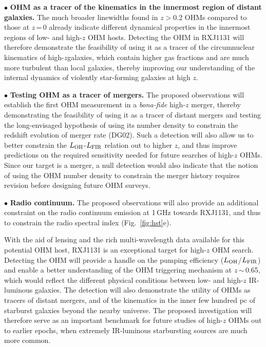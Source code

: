 \documentclass[letterpaper,11pt]{article}
\newcommand{\LFIR}{\mbox{$L_{\rm FIR}$}\xspace}
\newcommand{\LOH}{$L_{\rm OH}$\xspace}
\newcommand{\Fig}[1]{Fig.~\ref{fig:#1}}
\newcommand{\eq}{\,=\,}
\newcommand{\ssim}{\,$\sim$\,}
\newcommand{\highz}{high-$z$\space}
\newcommand{\obs}{observations\xspace}
\begin{document}
\noindent $\bullet$ {\bf OHM as a tracer of the kinematics in the innermost region of distant galaxies.}
The much broader linewidths found in $z$$>$0.2 OHMs \citep[typically at least a factor of $>$2 in FWHM;][DG02]{Baan92a}
compared to those at $z$\eq0 already indicate
different dynamical properties in the innermost regions of low- and high-$z$ OHM hosts.
Detecting the OHM in RXJ1131 will therefore demonstrate the feasibility of
using it as a tracer of the circumnuclear kinematics of \highz galaxies, which contain higher 
gas fractions and are much more turbulent than local galaxies, thereby improving
our understanding of the internal dynamics of violently star-forming galaxies at high $z$.

\noindent $\bullet$ {\bf Testing OHM as a tracer of mergers.}
The proposed \obs will establish the first OHM measurement in a {\it bona-fide} high-$z$ merger, thereby
demonstrating the feasibility of using it as a tracer of distant mergers and
testing the long-envisaged hypothesis of using its number density to constrain
the redshift evolution of merger rate (DG02).
Such a detection will also allow us to better constrain the
\LOH-\LFIR relation out to higher $z$, %
and thus improve predictions on the required sensitivity needed for future searches of high-$z$ OHMs.
Since our target is a merger,
a null detection would also indicate that the notion of
using the OHM number density to constrain the merger history requires revision before designing future OHM surveys.

\noindent $\bullet$ {\bf Radio continuum.}
The proposed \obs will also provide an additional constraint on the radio continuum emission at 1\,GHz 
towards RXJ1131, and thus to constrain the radio spectral index (\Fig{hst}e).

\noindent
With the aid of lensing and the rich multi-wavelength data available for this potential OHM host, RXJ1131 is an exceptional target
for high-$z$ OHM search. 
Detecting the OHM will provide a handle on the pumping efficiency (\LOH/\LFIR)
and enable a better understanding of the OHM triggering mechanism at $z$\ssim0.65, which
would reflect the different physical conditions between low- and high-$z$ IR-luminous galaxies.
The detection will also demonstrate the utility of OHMs as tracers of distant mergers, and
of the kinematics in the inner few hundred pc
of starburst galaxies beyond the nearby universe. %
The proposed investigation will therefore serve as an
important benchmark for future studies of high-$z$ OHMs out to earlier epochs,
when extremely IR-luminous starbursting sources are much more common.
\end{document}
